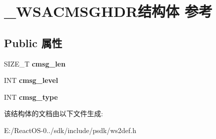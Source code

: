 \hypertarget{struct___w_s_a_c_m_s_g_h_d_r}{}\section{\+\_\+\+W\+S\+A\+C\+M\+S\+G\+H\+D\+R结构体 参考}
\label{struct___w_s_a_c_m_s_g_h_d_r}
\subsection*{Public 属性}
\begin{DoxyCompactItemize}
\item 
\mbox{\label{struct___w_s_a_c_m_s_g_h_d_r_a8eaba5f600942e59bfab8589c3526999}} 
S\+I\+Z\+E\+\_\+T {\bfseries cmsg\+\_\+len}
\item 
\mbox{\label{struct___w_s_a_c_m_s_g_h_d_r_ac4a1802e540ae8acfb1f6e10d2d80ec2}} 
I\+NT {\bfseries cmsg\+\_\+level}
\item 
\mbox{\label{struct___w_s_a_c_m_s_g_h_d_r_a460b9fcb133964021439784ad29dc369}} 
I\+NT {\bfseries cmsg\+\_\+type}
\end{DoxyCompactItemize}


该结构体的文档由以下文件生成\+:\begin{DoxyCompactItemize}
\item 
E\+:/\+React\+O\+S-\/0../sdk/include/psdk/ws2def.\+h\end{DoxyCompactItemize}
